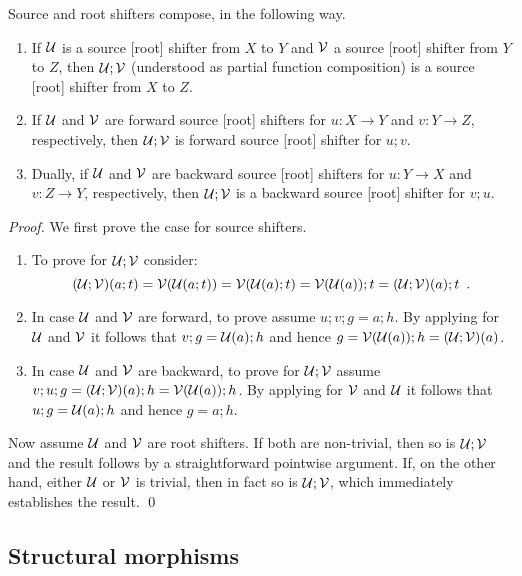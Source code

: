 %
Source and root shifters compose, in the following way.
%
\begin{proposition}
\begin{enumerate}[topsep=\smallskipamount]
\item If $\mathcal{U}$ is a source [root] shifter from $X$ to $Y$ and $\mathcal{V}$ a source [root] shifter from $Y$ to $Z$, then $\mathcal{U};\mathcal{V}$ (understood as partial function composition) is a source [root] shifter from $X$ to $Z$. 
\item If $\mathcal{U}$ and $\mathcal{V}$ are forward source [root] shifters for $u: X\to Y$ and $v: Y \to Z$, respectively, then $\mathcal{U};\mathcal{V}$ is forward source [root] shifter for $u;v$.
\item Dually, if $\mathcal{U}$ and $\mathcal{V}$ are backward source [root] shifters for $u: Y\to X$ and $v: Z \to Y$, respectively, then $\mathcal{U};\mathcal{V}$ is a backward source [root] shifter for $v;u$.
\end{enumerate}
\end{proposition}

\begin{proof}
We first prove the case for source shifters.
\begin{enumerate}
\item To prove  for $\mathcal{U};\mathcal{V}$ consider:
\[ (\mathcal{U};\mathcal{V})(a;t) = \mathcal{V}(\mathcal{U}(a;t))= \mathcal{V}(\mathcal{U}(a);t)=\mathcal{V}(\mathcal{U}(a));t=(\mathcal{U};\mathcal{V})(a);t \enspace. \]

\item In case $\mathcal{U}$ and $\mathcal{V}$ are forward, to prove  assume $u;v;g=a;h$. By applying  for $\mathcal{U}$ and $\mathcal{V}$ it follows that $v;g=\mathcal{U}(a);h$ and hence $g=\mathcal{V}(\mathcal{U}(a));h=(\mathcal{U};\mathcal{V})(a)$.

\item In case $\mathcal{U}$ and $\mathcal{V}$ are backward, to prove  for $\mathcal{U};\mathcal{V}$ assume $v;u;g=(\mathcal{U};\mathcal{V})(a);h=\mathcal{V}(\mathcal{U}(a));h$. By applying  for $\mathcal{V}$ and $\mathcal{U}$ it follows that $u;g=\mathcal{U}(a);h$ and hence $g=a;h$.
\end{enumerate}
%
Now assume $\mathcal{U}$ and $\mathcal{V}$ are root shifters. If both are non-trivial, then so is $\mathcal{U};\mathcal{V}$ and the result follows by a straightforward pointwise argument. If, on the other hand, either $\mathcal{U}$ or $\mathcal{V}$ is trivial, then in fact so is $\mathcal{U};\mathcal{V}$, which immediately establishes the result.
\qed
\end{proof}

\subsection{Structural morphisms}

